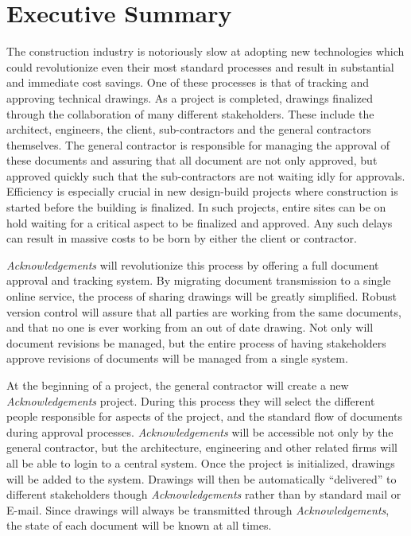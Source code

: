 \section{Executive Summary}

The construction industry is notoriously slow at adopting new technologies which could revolutionize even their most standard processes and result in substantial and immediate cost savings. One of these processes is that of tracking and approving technical drawings. As a project is completed, drawings finalized through the collaboration of many different stakeholders. These include the architect, engineers, the client, sub-contractors and the general contractors themselves. The general contractor is responsible for managing the approval of these documents and assuring that all document are not only approved, but approved quickly such that the sub-contractors are not waiting idly for approvals. Efficiency is especially crucial in new design-build projects where construction is started before the building is finalized. In such projects, entire sites can be on hold waiting for a critical aspect to be finalized and approved. Any such delays can result in massive costs to be born by either the client or contractor.

{\it Acknowledgements} will revolutionize this process by offering a full document approval and tracking system. By migrating document transmission to a single online service, the process of sharing drawings will be greatly simplified. Robust version control will assure that all parties are working from the same documents, and that no one is ever working from an out of date drawing. Not only will document revisions be managed, but the entire process of having stakeholders approve revisions of documents will be managed from a single system.

At the beginning of a project, the general contractor will create a new {\it Acknowledgements} project. During this process they will select the different people responsible for aspects of the project, and the standard flow of documents during approval processes. {\it Acknowledgements} will be accessible not only by the general contractor, but the architecture, engineering and other related firms will all be able to login to a central system. Once the project is initialized, drawings will be added to the system. Drawings will then be automatically ``delivered'' to different stakeholders though {\it Acknowledgements} rather than by standard mail or E-mail. Since drawings will always be transmitted through {\it Acknowledgements}, the state of each document will be known at all times. 


